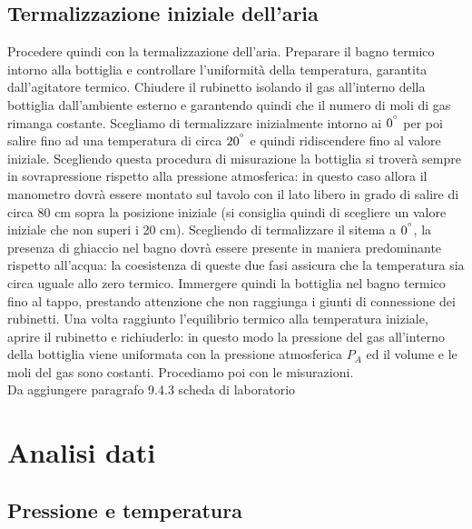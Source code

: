 \subsection{Termalizzazione iniziale dell'aria}
Procedere quindi con la termalizzazione dell'aria.
Preparare il bagno termico intorno alla bottiglia e controllare l'uniformità della temperatura, garantita dall'agitatore termico.
Chiudere il rubinetto isolando il gas all'interno della bottiglia dall'ambiente esterno e garantendo quindi che il numero di moli di gas rimanga costante.
Scegliamo di termalizzare inizialmente intorno ai $0^{\degree}$ per poi salire fino ad una temperatura di circa $20^{\degree}$ e quindi ridiscendere fino al valore iniziale.
Scegliendo questa procedura di misurazione la bottiglia si troverà sempre in sovrapressione rispetto alla pressione atmosferica: in questo caso allora il manometro dovrà essere montato sul tavolo con il lato libero in grado di salire di circa 80 cm sopra la posizione iniziale (si consiglia quindi di scegliere un valore iniziale che non superi i 20 cm).
Scegliendo di termalizzare il sitema a $0^{\degree}$, la presenza di ghiaccio nel bagno dovrà essere presente in maniera predominante rispetto all'acqua: la coesistenza di queste due fasi assicura che la temperatura sia circa uguale allo zero termico.
Immergere quindi la bottiglia nel bagno termico fino al tappo, prestando attenzione che non raggiunga i giunti di connessione dei rubinetti.
Una volta raggiunto l'equilibrio termico alla temperatura iniziale, aprire il rubinetto e richiuderlo: in questo modo la pressione del gas all'interno della bottiglia viene uniformata con la pressione atmosferica $P_{A}$ ed il volume e le moli del gas sono costanti. 
Procediamo poi con le misurazioni.\\
Da aggiungere paragrafo 9.4.3 scheda di laboratorio


\section{Analisi dati}
\subsection{Pressione e temperatura}

